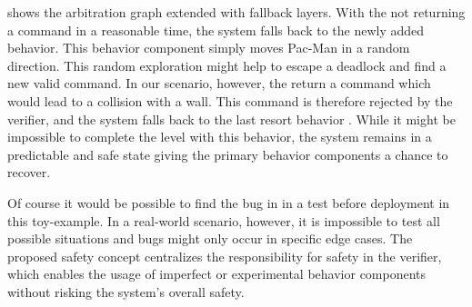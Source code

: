  shows the arbitration graph extended with fallback layers.
With the  not returning a command in a reasonable time, the system falls back to the newly added  behavior.
This behavior component simply moves Pac-Man in a random direction.
This random exploration might help to escape a deadlock and find a new valid command.
In our scenario, however, the  return a command which would lead to a collision with a wall.
This command is therefore rejected by the verifier, and the system falls back to the last resort behavior .
While it might be impossible to complete the level with this behavior, the system remains in a predictable and safe state giving the primary behavior components a chance to recover.

Of course it would be possible to find the bug in  in a test before deployment in this toy-example.
In a real-world scenario, however, it is impossible to test all possible situations and bugs might only occur in specific edge cases.
The proposed safety concept centralizes the responsibility for safety in the verifier, which enables the usage of imperfect or experimental behavior components without risking the system's overall safety.

